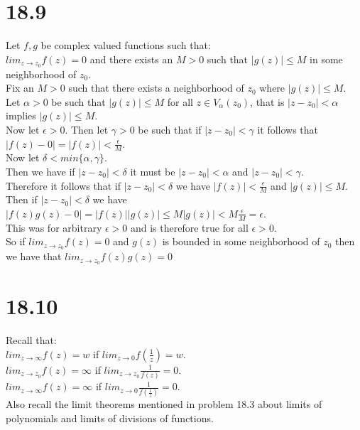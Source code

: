 \documentclass{article}
\begin{document}
\section*{18.9}
\begin{center}
    \doublespacing
    Let $f, g$ be complex valued functions such that:
    \\$lim _{z\rightarrow z_0} f(z) = 0$ and there exists an $M > 0$ such that $|g(z)|\leq M$ in some neighborhood of $z_0$.
    \\Fix an $M > 0$ such that there exists a neighborhood of $z_0$ where $|g(z)|\leq M$.
    \\Let $\alpha > 0$ be such that $|g(z)|\leq M$ for all $z\in V_{\alpha} (z_0)$, that is $|z - z_0| <\alpha$ implies $|g(z)|\leq M$.
    \\Now let $\epsilon > 0$. Then let $\gamma > 0$ be such that if $|z - z_0| <\gamma$ it follows that $|f(z) - 0| = |f(z)| <\frac{\epsilon}{M}$.
    \\Now let $\delta < min\{\alpha ,\gamma\}$.
    \\Then we have if $|z - z_0| <\delta$ it must be $|z - z_0| <\alpha$ and $|z - z_0| <\gamma$.
    \\Therefore it follows that if $|z - z_0| <\delta$ we have $|f(z)| <\frac{\epsilon}{M}$ and $|g(z)|\leq M$.
    \\Then if $|z - z_0| <\delta$ we have $|f(z) g(z) - 0| = |f(z)||g(z)|\leq M |g(z)| < M\frac{\epsilon}{M} =\epsilon$.
    \\This was for arbitrary $\epsilon > 0$ and is therefore true for all $\epsilon > 0$.
    \\So if $lim _{z\rightarrow z_0} f(z) = 0$ and $g(z)$ is bounded in some neighborhood of $z_0$ then we have that $lim _{z\rightarrow z_0} f(z) g(z) = 0$ \qedsymbol
\end{center}


\section*{18.10}
\begin{center}
    \doublespacing
    Recall that:
    \\$lim _{z\rightarrow\infty} f(z) = w$ if $lim _{z\rightarrow 0} f(\frac{1}{z}) = w$.
    \\$lim _{z\rightarrow z_0} f(z) =\infty$ if $lim _{z\rightarrow z_0}\frac{1}{f(z)} = 0$.
    \\$lim _{z\rightarrow\infty} f(z) =\infty$ if $lim _{z\rightarrow 0}\frac{1}{f(\frac{1}{z})} = 0$.
    \\Also recall the limit theorems mentioned in problem 18.3 about limits of polynomials and limits of divisions of functions.
\end{center}
\end{document}
